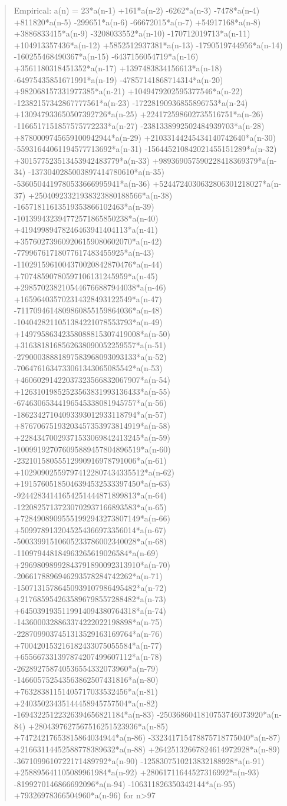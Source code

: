 \documentclass[11pt]{article}
\theoremstyle{definition}
\begin{document}
\begin{quote}\ttfamily Empirical: a(n) = 23*a(n-1) +161*a(n-2) -6262*a(n-3) -7478*a(n-4) +811820*a(n-5) -299651*a(n-6) -66672015*a(n-7) +54917168*a(n-8) +3886833415*a(n-9) -3208033552*a(n-10) -170712019713*a(n-11) +104913357436*a(n-12) +5852512937381*a(n-13) -1790519744956*a(n-14) -160255468490367*a(n-15) -6437156054719*a(n-16) +3561180318451352*a(n-17) +1397483834156613*a(n-18) -64975435851671991*a(n-19) -47857141868714314*a(n-20) +982068157331977385*a(n-21) +1049479202595377546*a(n-22) -12382157342867777561*a(n-23) -17228190936855896753*a(n-24) +130947933650507392726*a(n-25) +224172598602735516751*a(n-26) -1166517151857575772233*a(n-27) -2381338992502484939703*a(n-28) +8780009745659100942944*a(n-29) +21033144245434140742640*a(n-30) -55931644061194577713692*a(n-31) -156445210842021455151289*a(n-32) +301577523513453942483779*a(n-33) +989369057590228418369379*a(n-34) -1373040285003897414780610*a(n-35) -5360504419780533666995941*a(n-36) +5244724030632806301218027*a(n-37) +25040923321938323880188566*a(n-38) -16571811613519353866102463*a(n-39) -101399432394772571865850238*a(n-40) +41949989478246463941404113*a(n-41) +357602739609206159080602070*a(n-42) -77996761718077617483455925*a(n-43) -1102915961004370020842870476*a(n-44) +70748590780597106131245959*a(n-45) +2985702382105446766887944038*a(n-46) +165964035702314328493122549*a(n-47) -7117094614809860855159864036*a(n-48) -1040428211051384221078553793*a(n-49) +14979586342358088815307419008*a(n-50) +3163818168562638090052259557*a(n-51) -27900038881897583968093093133*a(n-52) -7064761634733061343065085542*a(n-53) +46060291422037323566832067907*a(n-54) +12631019852523563831993136433*a(n-55) -67463065344196545338081945757*a(n-56) -18623427104093393012933118794*a(n-57) +87670675193203457353973814919*a(n-58) +22843470029371533069842413245*a(n-59) -100991927076095889457804896519*a(n-60) -23210158055512990916978791006*a(n-61) +102909025597974122807434335512*a(n-62) +19157605185046394532533397450*a(n-63) -92442834141654251444871899813*a(n-64) -12208257137230702937166893583*a(n-65) +72849089095551992943273807149*a(n-66) +5099789132045254366973356014*a(n-67) -50033991510605233786002340028*a(n-68) -110979448184963265619026584*a(n-69) +29698098992843791890092313910*a(n-70) -2066178896946293578284742262*a(n-71) -15071315786450939107986495482*a(n-72) +2176859542635896798557288482*a(n-73) +6450391935119914094380764318*a(n-74) -1436000328863374222022198898*a(n-75) -2287099037451313529163169764*a(n-76) +700420153216182433075055584*a(n-77) +655667331397874207499607112*a(n-78) -262892758740536554332073960*a(n-79) -146605752543563862507431816*a(n-80) +76328381151405717033532456*a(n-81) +24035023435144458945757504*a(n-82) -16943225122326394656821184*a(n-83) -2503686041810753746073920*a(n-84) +2804397627567516251523936*a(n-85) +74724217653815864034944*a(n-86) -332341715478875718775040*a(n-87) +21663114452588778389632*a(n-88) +26425132667824614972928*a(n-89) -3671099610722171489792*a(n-90) -1258307510213832188928*a(n-91) +258895641105089961984*a(n-92) +28061711644527316992*a(n-93) -8199270146866692096*a(n-94) -106311826350342144*a(n-95) +79326978366504960*a(n-96) for n>97\end{quote}
\end{document}
